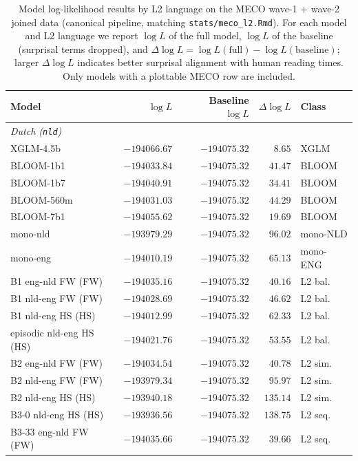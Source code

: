 \documentclass[11pt]{article}
\begin{document}
\begin{table}[!ht]
  \centering
  \small
  \caption{Model log-likelihood results by L2 language on the MECO wave-1 + wave-2 joined data (canonical pipeline, matching \texttt{stats/meco\_l2.Rmd}). For each model and L2 language we report $\log L$ of the full model, $\log L$ of the baseline (surprisal terms dropped), and $\Delta\log L = \log L(\text{full}) - \log L(\text{baseline})$; larger $\Delta\log L$ indicates better surprisal alignment with human reading times. Only models with a plottable MECO row are included.}
  \label{tab:meco_langrows}
  \begin{tabular}{lrrrl}
    \toprule
    Model & $\log L$ & Baseline $\log L$ & $\Delta\log L$ & Class \\
    \midrule
    \multicolumn{5}{l}{\textit{Dutch (\texttt{nld})}} \\
    \midrule
    XGLM-4.5b & $-194066.67$ & $-194075.32$ & $8.65$ & XGLM \\
    BLOOM-1b1 & $-194033.84$ & $-194075.32$ & $41.47$ & BLOOM \\
    BLOOM-1b7 & $-194040.91$ & $-194075.32$ & $34.41$ & BLOOM \\
    BLOOM-560m & $-194031.03$ & $-194075.32$ & $44.29$ & BLOOM \\
    BLOOM-7b1 & $-194055.62$ & $-194075.32$ & $19.69$ & BLOOM \\
    mono-nld & $-193979.29$ & $-194075.32$ & $96.02$ & mono-NLD \\
    mono-eng & $-194010.19$ & $-194075.32$ & $65.13$ & mono-ENG \\
    B1 eng-nld FW (FW) & $-194035.16$ & $-194075.32$ & $40.16$ & L2 bal. \\
    B1 nld-eng FW (FW) & $-194028.69$ & $-194075.32$ & $46.62$ & L2 bal. \\
    B1 nld-eng HS (HS) & $-194012.99$ & $-194075.32$ & $62.33$ & L2 bal. \\
    episodic nld-eng HS (HS) & $-194021.76$ & $-194075.32$ & $53.55$ & L2 bal. \\
    B2 eng-nld FW (FW) & $-194034.54$ & $-194075.32$ & $40.78$ & L2 sim. \\
    B2 nld-eng FW (FW) & $-193979.34$ & $-194075.32$ & $95.97$ & L2 sim. \\
    B2 nld-eng HS (HS) & $-193940.18$ & $-194075.32$ & $135.14$ & L2 sim. \\
    B3-0 nld-eng HS (HS) & $-193936.56$ & $-194075.32$ & $138.75$ & L2 seq. \\
    B3-33 eng-nld FW (FW) & $-194035.66$ & $-194075.32$ & $39.66$ & L2 seq. \\

\end{tabular}
\end{table}
\end{document}
